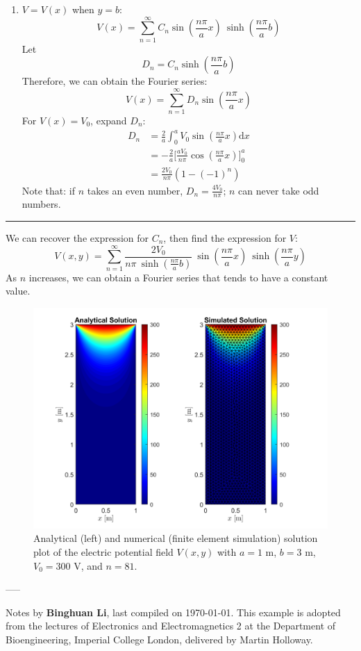 \documentclass[a4paper, 12pt]{article}
\begin{document}
\begin{mdframed}
\begin{enumerate}
    \item $V=V(x)$ when $y=b$:
        \[  
            V(x) = \sum^{\infty}_{n=1} C_{n} \sin\left(\frac{n\pi}{a} x \right) \ \sinh\left(\frac{n\pi}{a} b\right)
        \]
        Let 
        \[ 
            D_{n} = C_{n} \sinh\left(\frac{n\pi}{a} b \right)
        \]
    Therefore, we can obtain the Fourier series:
    \[
        V(x) = \sum^{\infty}_{n=1} D_{n} \sin\left( \frac{n\pi}{a} x \right) 
    \]
   For $V(x) = V_{0}$, expand $D_{n} $:
   \begin{align*}
    D_{n}
    & = \frac{2}{a} \int_{0}^{a} V_{0} \sin\left(\frac{n\pi}{a} x\right) \mathrm{d}x \\
    & = -\frac{2}{a} \bigg[ \frac{aV_{0}}{n\pi} \cos\left(\frac{n\pi}{a} x\right) \bigg]^{a}_{0}\\
    & = \frac{2V_{0}}{n\pi}(1-(-1)^{n})
    \end{align*}
    Note that: if $n$ takes an even number, $D_{n}=\frac{4V_{0}}{n\pi} $; $n$ can never take odd numbers.
\end{enumerate}
 \hrule \vspace{.3cm}
 
We can recover the expression for $C_{n}$, then find the expression for $V$:
\[
    V(x, y) = \sum^{\infty}_{n=1} \frac{2V_{0}}{n\pi \ \sinh(\frac{n\pi}{a} b)} \ \sin \left( \frac{n\pi}{a} x \right) \ \sinh \left( \frac{n\pi}{a} y \right) 
\]
As $n$ increases, we can obtain a Fourier series that tends to have a constant value. 

\begin{figure}[H]
    \centering
    \includegraphics[width=0.9\linewidth]{./images/corridor_sol.png}
    \caption{Analytical (left) and numerical (finite element simulation) solution plot of the electric potential field $V(x, y)$ with $a=1$ m, $b=3$ m, $V_0=300$ V, and $n=81$.}
    \label{fig:corridor_sol}
\end{figure}
\end{mdframed}


\vfill
-----

Notes by \textbf{Binghuan Li}, last compiled on \today. This example is adopted from the lectures of Electronics and Electromagnetics 2 at the Department of Bioengineering, Imperial College London, delivered by Martin Holloway.  
\end{document}
